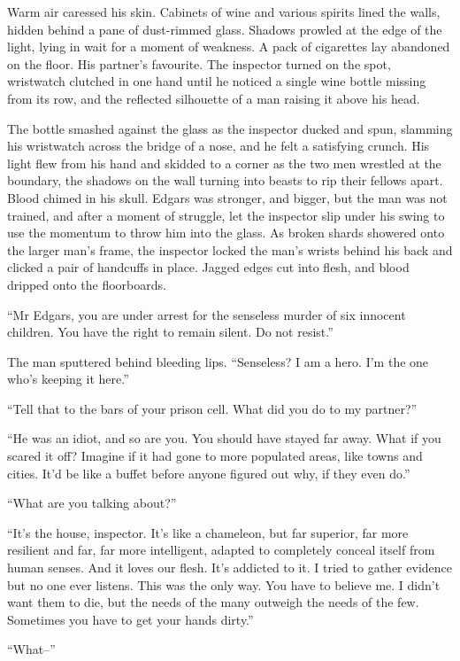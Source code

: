 Warm air caressed his skin. Cabinets of wine and various spirits lined the walls, hidden behind a pane of dust-rimmed glass. Shadows prowled at the edge of the light, lying in wait for a moment of weakness. A pack of cigarettes lay abandoned on the floor. His partner’s favourite. The inspector turned on the spot, wristwatch clutched in one hand until he noticed a single wine bottle missing from its row, and the reflected silhouette of a man raising it above his head. 

The bottle smashed against the glass as the inspector ducked and spun, slamming his wristwatch across the bridge of a nose, and he felt a satisfying crunch. His light flew from his hand and skidded to a corner as the two men wrestled at the boundary, the shadows on the wall turning into beasts to rip their fellows apart. Blood chimed in his skull. Edgars was stronger, and bigger, but the man was not trained, and after a moment of struggle, let the inspector slip under his swing to use the momentum to throw him into the glass. As broken shards showered onto the larger man’s frame, the inspector locked the man’s wrists behind his back and clicked a pair of handcuffs in place. Jagged edges cut into flesh, and blood dripped onto the floorboards.

“Mr Edgars, you are under arrest for the senseless murder of six innocent children. You have the right to remain silent. Do not resist.”

The man sputtered behind bleeding lips. “Senseless? I am a hero. I’m the one who’s keeping it here.”

“Tell that to the bars of your prison cell. What did you do to my partner?”

“He was an idiot, and so are you. You should have stayed far away. What if you scared it off? Imagine if it had gone to more populated areas, like towns and cities. It’d be like a buffet before anyone figured out why, if they even do.”

“What are you talking about?”

“It’s the house, inspector. It’s like a chameleon, but far superior, far more resilient and far, far more intelligent, adapted to completely conceal itself from human senses. And it loves our flesh. It’s addicted to it. I tried to gather evidence but no one ever listens. This was the only way. You have to believe me. I didn’t want them to die, but the needs of the many outweigh the needs of the few. Sometimes you have to get your hands dirty.”

“What–”

